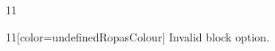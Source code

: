 \documentclass[paper=A4]{ropas-poster}
\begin{document}
\begin{postergrid}{1}{1}
\begin{posterblock}{1}{1}[color=undefinedRopasColour]
Invalid block option.
\end{posterblock}
\end{postergrid}
\end{document}
